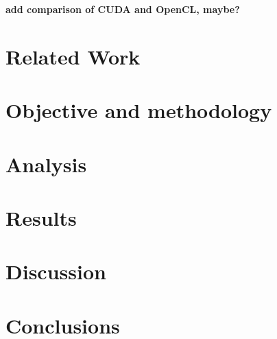\documentclass[10pt,onecolumn,twoside,english,a4paper]{article}
\begin{document}
\textbf{add comparison of CUDA and OpenCL, maybe?}

\section{Related Work} \label{Existing solutions}

\section{Objective and methodology} \label{Objective}

\section{Analysis} \label{Analysis}

\section{Results} \label{Results}

\section{Discussion} \label{Discussion}

\section{Conclusions} \label{Conclusions} %



\end{document}
